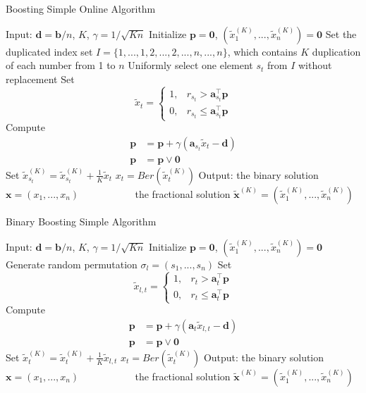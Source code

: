 \documentclass{article} %
\begin{document}
\begin{algorithm}[ht!]
\caption{Boosting Simple Online Algorithm}
\label{alg:bSOA}
\begin{algorithmic}[1]
\State Input: $\bm{d}=\bm{b}/n$, $K$, $\gamma=1/\sqrt{Kn}$
\State Initialize $\bm{p} = \bm{0}$, $(\tilde{{x}}^{(K)}_1,...,\tilde{{x}}^{(K)}_n)=\bm{0}$
\State Set the duplicated index set $I=\{1,...,1,2,...,2,...,n,...,n\}$, which contains $K$ duplication of each number from 1 to $n$
    \State Uniformly select one element $s_t$ from $I$ without replacement
        \State Set 
            $$\tilde{x}_{t} = \begin{cases}
            1,& r_{s_t} >\bm{a}_{s_t}^\top \bm{p} \\
            0,& r_{s_t} \le \bm{a}_{s_t}^\top \bm{p} 
            \end{cases}$$
            \State Compute
            \begin{align*}
                \bm{p} & = \bm{p} + \gamma \left(\bm{a}_{s_t}\tilde{x}_{t} - \bm{d}\right) \\
                \bm{p} & = \bm{p} \vee \bm{0}
            \end{align*}
            \State Set $\tilde{{x}}^{(K)}_{s_t}=\tilde{{x}}^{(K)}_{s_t}+\frac{1}{K}\tilde{{x}}_{t}$
\EndFor
{}
    \State $x_t = Ber(\tilde{x}_t^{(K)})$
\EndFor
\State Output: the binary solution $\bm{x} = (x_1,...,x_n)$ 
\State ~~ ~~ ~~ ~~ the fractional solution $\tilde{\bm{x}}^{(K)}= (\tilde{x}_1^{(K)},...,\tilde{x}_n^{(K)})$
\end{algorithmic}
\end{algorithm}


\begin{algorithm}[ht!]
\caption{Binary Boosting Simple Algorithm}
\label{alg:bBSA}
\begin{algorithmic}[1]
\State Input: $\bm{d}=\bm{b}/n$, $K$, $\gamma=1/\sqrt{Kn}$
\State Initialize $\bm{p} = \bm{0}$, $(\tilde{{x}}^{(K)}_1,...,\tilde{{x}}^{(K)}_n)=\bm{0}$
    \State Generate random permutation $\sigma_l=(s_1,...,s_n)$
        \State Set 
            $$\tilde{x}_{l,t} = \begin{cases}
            1,& r_{t} >\bm{a}_{t}^\top \bm{p} \\
            0,& r_{t} \le \bm{a}_{t}^\top \bm{p} 
            \end{cases}$$
            \State Compute
            \begin{align*}
                \bm{p} & = \bm{p} + \gamma \left(\bm{a}_{t}\tilde{x}_{l,t} - \bm{d}\right) \\
                \bm{p} & = \bm{p} \vee \bm{0}
            \end{align*}
            \State Set $\tilde{{x}}^{(K)}_t=\tilde{{x}}^{(K)}_t+\frac{1}{K}\tilde{{x}}_{l,t}$
    \EndFor
\EndFor
{}
    \State $x_t = Ber(\tilde{x}_t^{(K)})$
\EndFor
\State Output: the binary solution $\bm{x} = (x_1,...,x_n)$ 
\State ~~ ~~ ~~ ~~ the fractional solution $\tilde{\bm{x}}^{(K)}= (\tilde{x}_1^{(K)},...,\tilde{x}_n^{(K)})$
\end{algorithmic}
\end{algorithm}
\end{document}
